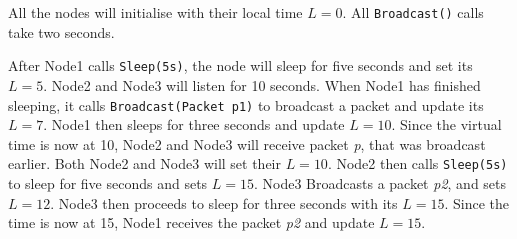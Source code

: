 All the nodes will initialise with their local time $L = 0$. All \texttt{Broadcast()} calls take two seconds.\smallbreak

After Node1 calls \texttt{Sleep(5s)}, the node will sleep for five seconds and set its $L = 5$. Node2 and Node3 will listen for 10 seconds. When Node1 has finished sleeping, it calls \texttt{Broadcast(Packet p1)} to broadcast a packet and update its $L = 7$. Node1 then sleeps for three seconds and update $L = 10$. Since the virtual time is now at 10, Node2 and Node3 will receive packet \textit{p}, that was broadcast earlier. Both Node2 and Node3 will set their $L = 10$. Node2 then calls \texttt{Sleep(5s)} to sleep for five seconds and sets $L = 15$. Node3 Broadcasts a packet \textit{p2}, and sets $L = 12$. Node3 then proceeds to sleep for three seconds with its $L = 15$. Since the time is now at 15, Node1 receives the packet \textit{p2} and update $L = 15$.




